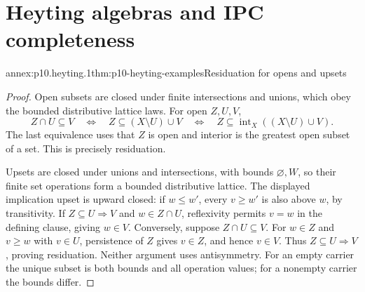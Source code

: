 
\section{Heyting algebras and IPC completeness}

\begin{annexitem}{annex:p10.heyting.1}{thm:p10-heyting-examples}{Residuation for opens and upsets}
\begin{proof}
Open subsets are closed under finite intersections and unions,
which obey the bounded distributive lattice laws.
For open \(Z,U,V\),
\[
 Z\cap U\subseteq V
 \quad\Longleftrightarrow\quad
 Z\subseteq(X\setminus U)\cup V
 \quad\Longleftrightarrow\quad
 Z\subseteq\operatorname{int}_X((X\setminus U)\cup V).
\]
The last equivalence uses that \(Z\) is open and interior is
the greatest open subset of a set.
This is precisely residuation.

Upsets are closed under unions and intersections, with bounds
\(\varnothing,W\), so their finite set operations form a
bounded distributive lattice.
The displayed implication upset is upward closed: if \(w\leq w'\),
every \(v\geq w'\) is also above \(w\), by transitivity.
If \(Z\subseteq U\Rightarrow V\) and \(w\in Z\cap U\),
reflexivity permits \(v=w\) in the defining clause, giving
\(w\in V\).
Conversely, suppose \(Z\cap U\subseteq V\).
For \(w\in Z\) and \(v\geq w\) with \(v\in U\), persistence
of \(Z\) gives \(v\in Z\), and hence \(v\in V\).
Thus \(Z\subseteq U\Rightarrow V\), proving residuation.
Neither argument uses antisymmetry.
For an empty carrier the unique subset is both bounds and
all operation values; for a nonempty carrier the bounds differ.
\end{proof}
\end{annexitem}


